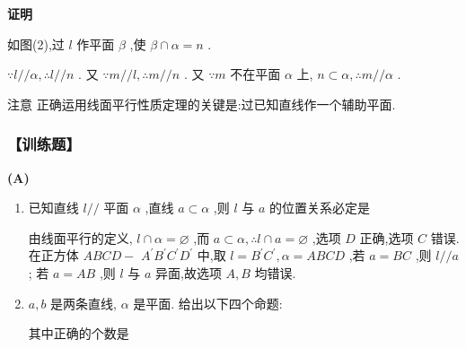 \textbf{证明} 

如图(2),过 $l$ 作平面 $\beta$ ,使 $\beta  \cap  \alpha  = n$ .

$\because l//\alpha ,\therefore l//n$ . 又 $\because m//l,\therefore m//n$ . 又 $\because m$ 不在平面 $\alpha$ 上, $n \subset  \alpha ,\therefore m//\alpha$ .

注意 正确运用线面平行性质定理的关键是:过已知直线作一个辅助平面.

\subsubsection*{【训练题】}

\begin{center}  \textbf{(A)} \end{center}
\begin{enumerate}
    \item 已知直线 $l//$ 平面 $\alpha$ ,直线 $a \subset  \alpha$ ,则 $l$ 与 $a$ 的位置关系必定是
    \begin{jieda}
        由线面平行的定义, $l \cap  \alpha  = \varnothing$ ,而 $a \subset  \alpha ,\therefore l \cap  a = \varnothing$ ,选项 $D$ 正确,选项 $C$ 错误. 在正方体 ${ABCD} -$  ${A}^{\prime }{B}^{\prime }{C}^{\prime }{D}^{\prime }$ 中,取 $l = {B}^{\prime }{C}^{\prime },\alpha  = {ABCD}$ ,若 $a = {BC}$ ,则 $l//a$ ; 若 $a = {AB}$ ,则 $l$ 与 $a$ 异面,故选项 $A,B$ 均错误.
    \end{jieda}
    \item $a,b$ 是两条直线, $\alpha$ 是平面. 给出以下四个命题:
    其中正确的个数是
    \begin{jieda}
\end{jieda}
\end{enumerate}
